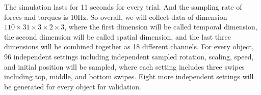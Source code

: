 The simulation lasts for 11 seconds for every trial. And the sampling rate of forces and torques is 10Hz. So overall, we will collect data of dimension $110 \times 31 \times 3 \times 2 \times 3$, where the first dimension will be called temporal dimension, the second dimension will be called spatial dimension, and the last three dimensions will be combined together as 18 different channels. 
For every object, 96 independent settings including independent sampled rotation, scaling, speed, and initial position will be sampled, where each setting includes three swipes including top, middle, and bottom swipes. Eight more independent settings will be generated for every object for validation.